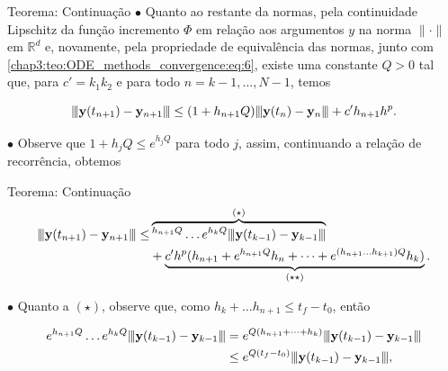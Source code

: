 \documentclass{beamer}
\newcommand{\vertiii}[1]{{\left\vert\kern-0.25ex\left\vert\kern-0.25ex\left\vert #1 
    \right\vert\kern-0.25ex\right\vert\kern-0.25ex\right\vert}}
\theoremstyle{plain}
\theoremstyle{definition}
\begin{document}

\begin{frame}{Teorema: Continuação}
    \phantom{aa} $\bullet$ Quanto ao restante da normas, pela continuidade Lipschitz da função incremento \(\Phi\) em relação aos argumentos \(y\) na norma \(\|\cdot\|\) em \(\mathbb{R}^{d}\) e, novamente, pela propriedade de equivalência das normas, junto com \eqref{chap3:teo:ODE_methods_convergence:eq:6}, existe uma constante \(Q>0\) tal que, para $c' = k_1 k_2$ e para todo $n = k - 1, \dots, N -1$, temos

    \[
      \vertiii{\mathbf{y}(t_{n+1})-\mathbf{y}_{n+1}} \leq (1+h_{n+1} Q) \vertiii{\mathbf{y}(t_{n})-\mathbf{y}_{n}} 
      +c^{\prime} h_{n+1} h^{p}.
    \]

    \phantom{aa} $\bullet$ Observe que $1 + h_j Q \leq e^{h_j Q}$ para todo $j$, assim, continuando a relação de recorrência, obtemos

\end{frame}



\begin{frame}{Teorema: Continuação}
    \begin{align*}
        \vertiii{\mathbf{y}(t_{n+1})-\mathbf{y}_{n+1}} \leq & \overbrace{^{h_{n+1}Q} \dots e^{h_{k}Q} \vertiii{\mathbf{y}(t_{k-1})-\mathbf{y}_{k-1}}}^{(\star)} \\
                                                            &+ \underbrace{c' h^p (h_{n+1} + e^{h_{n+1}Q}h_n + \dots + e^{(h_{n+1} \dots h_{k+1})Q}h_k)}_{(\star \star)}.
    \end{align*}

    \phantom{aa} $\bullet$ Quanto a $(\star)$, observe que, como $h_k + \dots h_{n+1} \leq t_f - t_0$, então

    \begin{align*}
      e^{h_{n+1}Q} \dots e^{h_{k}Q} \vertiii{\mathbf{y}(t_{k-1})-\mathbf{y}_{k-1}} &= e^{Q(h_{n+1} + \dots + h_k)} \vertiii{\mathbf{y}(t_{k-1})-\mathbf{y}_{k-1}} \\
                                                                                   &\leq e^{Q(t_f - t_0)} \vertiii{\mathbf{y}(t_{k-1})-\mathbf{y}_{k-1}},
    \end{align*}
\end{frame}
\end{document}
